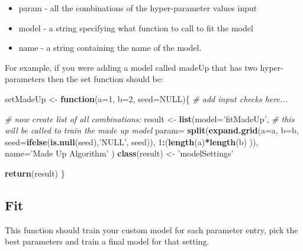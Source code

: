 \documentclass[]{article}
\newenvironment{Shaded}{\begin{snugshade}}{\end{snugshade}}
\newcommand{\KeywordTok}[1]{\textcolor[rgb]{0.13,0.29,0.53}{\textbf{#1}}}
\newcommand{\DataTypeTok}[1]{\textcolor[rgb]{0.13,0.29,0.53}{#1}}
\newcommand{\DecValTok}[1]{\textcolor[rgb]{0.00,0.00,0.81}{#1}}
\newcommand{\StringTok}[1]{\textcolor[rgb]{0.31,0.60,0.02}{#1}}
\newcommand{\CommentTok}[1]{\textcolor[rgb]{0.56,0.35,0.01}{\textit{#1}}}
\newcommand{\OtherTok}[1]{\textcolor[rgb]{0.56,0.35,0.01}{#1}}
\newcommand{\ControlFlowTok}[1]{\textcolor[rgb]{0.13,0.29,0.53}{\textbf{#1}}}
\newcommand{\OperatorTok}[1]{\textcolor[rgb]{0.81,0.36,0.00}{\textbf{#1}}}
\newcommand{\NormalTok}[1]{#1}
\providecommand{\tightlist}{%
  \setlength{\itemsep}{0pt}\setlength{\parskip}{0pt}}
\begin{document}
\begin{itemize}
\tightlist
\item
  param - all the combinations of the hyper-parameter values input
\item
  model - a string specifying what function to call to fit the model
\item
  name - a string containing the name of the model.
\end{itemize}

For example, if you were adding a model called madeUp that has two
hyper-parameters then the set function should be:

\begin{Shaded}
\begin{Highlighting}[]
\NormalTok{setMadeUp <-}\StringTok{ }\ControlFlowTok{function}\NormalTok{(}\DataTypeTok{a=}\DecValTok{1}\NormalTok{, }\DataTypeTok{b=}\DecValTok{2}\NormalTok{, }\DataTypeTok{seed=}\OtherTok{NULL}\NormalTok{)\{}
  \CommentTok{# add input checks here...}
  
  \CommentTok{# now create list of all combinations:}
\NormalTok{  result <-}\StringTok{ }\KeywordTok{list}\NormalTok{(}\DataTypeTok{model=}\StringTok{'fitMadeUp'}\NormalTok{, }\CommentTok{# this will be called to train the made up model}
                 \DataTypeTok{param=} \KeywordTok{split}\NormalTok{(}\KeywordTok{expand.grid}\NormalTok{(}\DataTypeTok{a=}\NormalTok{a, }
                                          \DataTypeTok{b=}\NormalTok{b,}
                                          \DataTypeTok{seed=}\KeywordTok{ifelse}\NormalTok{(}\KeywordTok{is.null}\NormalTok{(seed),}\StringTok{'NULL'}\NormalTok{, seed)),}
                              \DecValTok{1}\OperatorTok{:}\NormalTok{(}\KeywordTok{length}\NormalTok{(a)}\OperatorTok{*}\KeywordTok{length}\NormalTok{(b)  )),}
                 \DataTypeTok{name=}\StringTok{'Made Up Algorithm'}
\NormalTok{  )}
  \KeywordTok{class}\NormalTok{(result) <-}\StringTok{ 'modelSettings'} 
  
  \KeywordTok{return}\NormalTok{(result)}
\NormalTok{\}}
\end{Highlighting}
\end{Shaded}

\subsection{Fit}\label{fit}

This function should train your custom model for each parameter entry,
pick the best parameters and train a final model for that setting.
\end{document}
